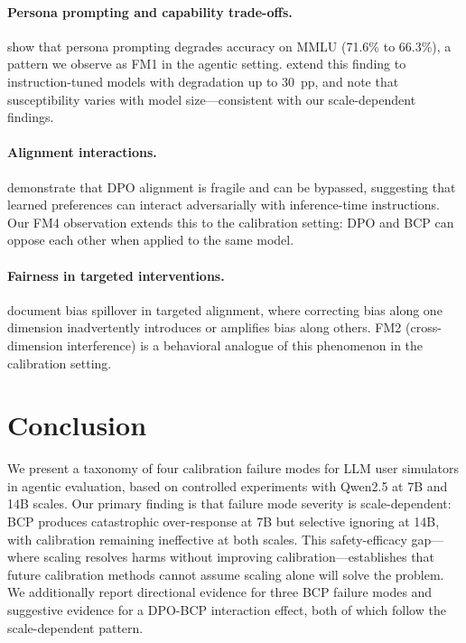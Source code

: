 \documentclass[11pt,a4paper]{article}
\begin{document}
\paragraph{Persona prompting and capability trade-offs.} \citet{basil2025playing_pretend} show that persona prompting degrades accuracy on MMLU (71.6\% to 66.3\%), a pattern we observe as FM1 in the agentic setting. \citet{hu2026expert_persona} extend this finding to instruction-tuned models with degradation up to 30~pp, and note that susceptibility varies with model size---consistent with our scale-dependent findings.

\paragraph{Alignment interactions.} \citet{lee2024dpo_toxicity} demonstrate that DPO alignment is fragile and can be bypassed, suggesting that learned preferences can interact adversarially with inference-time instructions. Our FM4 observation extends this to the calibration setting: DPO and BCP can oppose each other when applied to the same model.

\paragraph{Fairness in targeted interventions.} \citet{gupta2026intra_fairness} document bias spillover in targeted alignment, where correcting bias along one dimension inadvertently introduces or amplifies bias along others. FM2 (cross-dimension interference) is a behavioral analogue of this phenomenon in the calibration setting.

\section{Conclusion}

We present a taxonomy of four calibration failure modes for LLM user simulators in agentic evaluation, based on controlled experiments with Qwen2.5 at 7B and 14B scales. Our primary finding is that failure mode severity is scale-dependent: BCP produces catastrophic over-response at 7B but selective ignoring at 14B, with calibration remaining ineffective at both scales. This safety-efficacy gap---where scaling resolves harms without improving calibration---establishes that future calibration methods cannot assume scaling alone will solve the problem. We additionally report directional evidence for three BCP failure modes and suggestive evidence for a DPO-BCP interaction effect, both of which follow the scale-dependent pattern.
\end{document}
